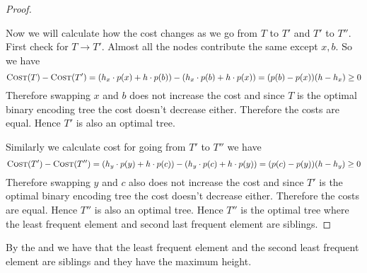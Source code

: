 \begin{proof}
\begin{center}
\label{fig:least-frequent-elm-siblings}
\end{center}

Now we will calculate how the cost changes as we go from $T$ to $T'$ and $T'$ to $T''$. First check for $T\to T'$. Almost all the nodes contribute the same except $x,b$. So we have $$\textsc{Cost}(T)-\textsc{Cost}(T')=(h_x\cdot p(x)+h\cdot p(b))-(h_x\cdot p(b)+h\cdot p(x))=(p(b)-p(x))(h-h_x)\geq 0$$Therefore swapping $x$ and $b$ does not increase the cost and since $T$ is the optimal binary encoding tree the cost doesn't decrease either. Therefore the costs are equal. Hence $T'$ is also an optimal tree. 

Similarly we calculate cost for going from $T'$ to $T''$ we have $$\textsc{Cost}(T')-\textsc{Cost}(T'')=(h_y\cdot p(y)+h\cdot p(c))-(h_y\cdot p(c)+h\cdot p(y))=(p(c)-p(y))(h-h_y)\geq 0$$Therefore swapping $y$ and $c$ also does not increase the cost and since $T'$ is the optimal binary encoding tree the cost doesn't decrease either. Therefore the costs are equal. Hence $T''$ is also an optimal tree. Hence $T''$ is the optimal tree where the least frequent element and second last frequent element are siblings.
\end{proof}




By the  and  we have that the least frequent element and the second least frequent element are siblings and they have the maximum height.

